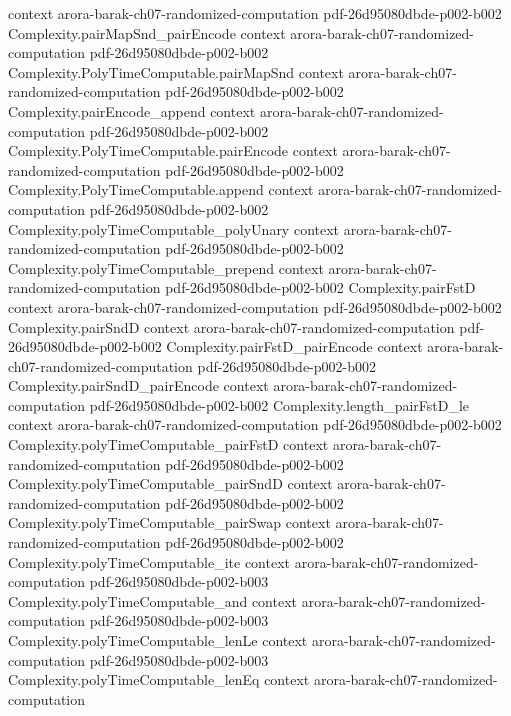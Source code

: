 \begin{theorem}
  {context}
  {arora-barak-ch07-randomized-computation}
  {pdf-26d95080dbde-p002-b002}
\proofstep
  {Complexity.pairMapSnd_pairEncode}
  {context}
  {arora-barak-ch07-randomized-computation}
  {pdf-26d95080dbde-p002-b002}
\proofstep
  {Complexity.PolyTimeComputable.pairMapSnd}
  {context}
  {arora-barak-ch07-randomized-computation}
  {pdf-26d95080dbde-p002-b002}
\proofstep
  {Complexity.pairEncode_append}
  {context}
  {arora-barak-ch07-randomized-computation}
  {pdf-26d95080dbde-p002-b002}
\proofstep
  {Complexity.PolyTimeComputable.pairEncode}
  {context}
  {arora-barak-ch07-randomized-computation}
  {pdf-26d95080dbde-p002-b002}
\proofstep
  {Complexity.PolyTimeComputable.append}
  {context}
  {arora-barak-ch07-randomized-computation}
  {pdf-26d95080dbde-p002-b002}
\proofstep
  {Complexity.polyTimeComputable_polyUnary}
  {context}
  {arora-barak-ch07-randomized-computation}
  {pdf-26d95080dbde-p002-b002}
\proofstep
  {Complexity.polyTimeComputable_prepend}
  {context}
  {arora-barak-ch07-randomized-computation}
  {pdf-26d95080dbde-p002-b002}
\proofstep
  {Complexity.pairFstD}
  {context}
  {arora-barak-ch07-randomized-computation}
  {pdf-26d95080dbde-p002-b002}
\proofstep
  {Complexity.pairSndD}
  {context}
  {arora-barak-ch07-randomized-computation}
  {pdf-26d95080dbde-p002-b002}
\proofstep
  {Complexity.pairFstD_pairEncode}
  {context}
  {arora-barak-ch07-randomized-computation}
  {pdf-26d95080dbde-p002-b002}
\proofstep
  {Complexity.pairSndD_pairEncode}
  {context}
  {arora-barak-ch07-randomized-computation}
  {pdf-26d95080dbde-p002-b002}
\proofstep
  {Complexity.length_pairFstD_le}
  {context}
  {arora-barak-ch07-randomized-computation}
  {pdf-26d95080dbde-p002-b002}
\proofstep
  {Complexity.polyTimeComputable_pairFstD}
  {context}
  {arora-barak-ch07-randomized-computation}
  {pdf-26d95080dbde-p002-b002}
\proofstep
  {Complexity.polyTimeComputable_pairSndD}
  {context}
  {arora-barak-ch07-randomized-computation}
  {pdf-26d95080dbde-p002-b002}
\proofstep
  {Complexity.polyTimeComputable_pairSwap}
  {context}
  {arora-barak-ch07-randomized-computation}
  {pdf-26d95080dbde-p002-b002}
\proofstep
  {Complexity.polyTimeComputable_ite}
  {context}
  {arora-barak-ch07-randomized-computation}
  {pdf-26d95080dbde-p002-b003}
\proofstep
  {Complexity.polyTimeComputable_and}
  {context}
  {arora-barak-ch07-randomized-computation}
  {pdf-26d95080dbde-p002-b003}
\proofstep
  {Complexity.polyTimeComputable_lenLe}
  {context}
  {arora-barak-ch07-randomized-computation}
  {pdf-26d95080dbde-p002-b003}
\proofstep
  {Complexity.polyTimeComputable_lenEq}
  {context}
  {arora-barak-ch07-randomized-computation}

\end{theorem}
